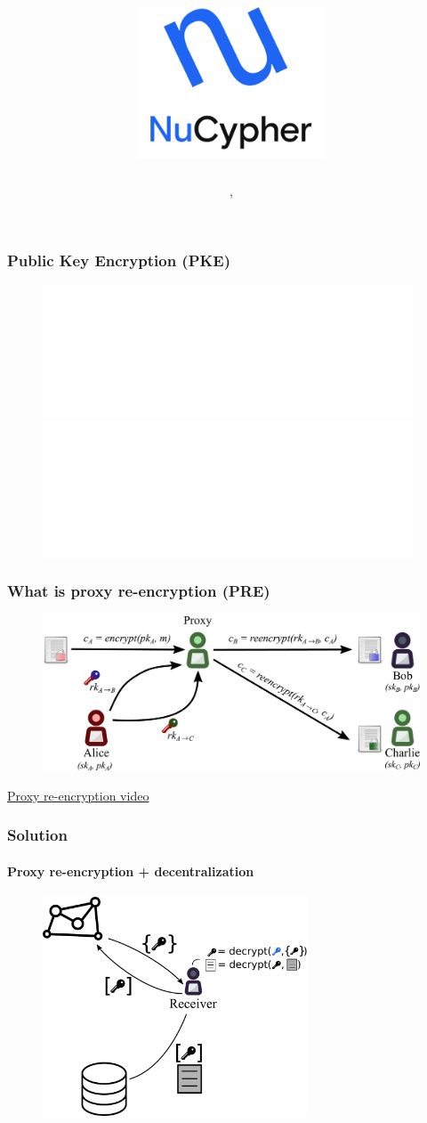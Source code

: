 \documentclass[xetex,mathsans,sans,aspectratio=169]{beamer}
\title[\titlefooter]{\includegraphics[width=5.5cm]{pdf/nucypher_logo.pdf}}
\author[\presenterfooter]{\presenter}
\date[\eventdate]{\event, \eventdate}
\begin{document}
    \begin{frame}
        \titlepage
    \end{frame}

    \begin{frame}
        \frametitle{Public Key Encryption (PKE)}
        \begin{figure}
            \centering
            \includegraphics<1>[width=11cm]{pdf/pke-multi.pdf}
            \includegraphics<2>[width=11cm]{pdf/pke-multi-hack.pdf}
        \end{figure}
    \end{frame}

    \begin{frame}
        \frametitle{What is proxy re-encryption (PRE)}
        \begin{figure}
            \centering
            \includegraphics[width=13cm]{pdf/pre-multi.pdf}
        \end{figure}
        \href{run:videos/pre-explainer.mp4}{Proxy re-encryption video}
    \end{frame}

    \begin{frame}
        \frametitle{Solution}
        \framesubtitle{Proxy re-encryption + decentralization}
        \begin{figure}
            \centering
            \includegraphics[height=6.5cm]{pdf/pre-kms.pdf}
        \end{figure}
    \end{frame}
\end{document}

